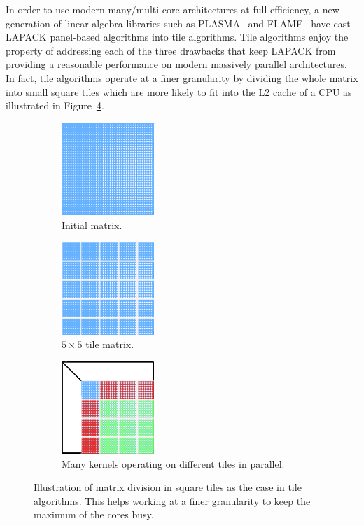 In order to use modern many/multi-core architectures at full
efficiency, a new generation of linear algebra libraries such as
PLASMA~\cite{DBLP:journals/corr/abs-0709-1272} and FLAME~\cite{FLAWN3}
have cast LAPACK panel-based algorithms into tile algorithms. Tile
algorithms enjoy the property of addressing each of the three
drawbacks that keep LAPACK from providing a reasonable performance on
modern massively parallel architectures.
In fact, tile algorithms operate at a
finer granularity by dividing the whole matrix into
small square tiles which are more likely to fit into the L2 cache of a
CPU as illustrated in Figure~\ref{fig:tile_algo}.
\begin{figure}[th]
  \captionsetup[subfigure]{justification=justified,singlelinecheck=false}
  \begin{subfigure}[t]{0.3 \textwidth}
    \includegraphics[width=3.5cm, height=3.5cm]{fig/one-sided-initial}
    \caption{\label{fig:initial_matrix}Initial matrix.}
  \end{subfigure}
  \hfill
  \begin{subfigure}[t]{0.3 \textwidth}
    \includegraphics[width=3.5cm, height=3.5cm]{fig/one-sided-tile}
    \caption{\label{fig:tile_matrix}
      $5\times 5$ tile matrix.}
  \end{subfigure}
  \hfill
    \begin{subfigure}[t]{0.3 \textwidth}
    \includegraphics[width=3.5cm, height=3.5cm]{fig/one-sided-tile-facto}
    \caption{\label{fig:tile_facto}
     Many kernels operating on different tiles in parallel.}
  \end{subfigure}
  \caption{Illustration of matrix division in square tiles as the case
    in tile algorithms. This helps working at  a finer granularity to
    keep the maximum of the cores busy.}
    \label{fig:tile_algo}
\end{figure}

